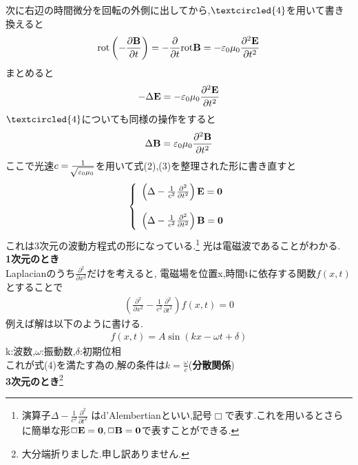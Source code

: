\documentclass{jsarticle}
\begin{document}
次に右辺の時間微分を回転の外側に出してから,$\textcircled{\scriptsize 4}$を用いて書き換えると
\begin{eqnarray*}
{\rm rot} \left( -\frac{\partial {\bf B}}{\partial t} \right) = -\frac{\partial}{\partial t} {\rm rot}{\bf B} = - \varepsilon_0 \mu_0 \frac{\partial^2 {\bf E}}{\partial t^2}
\end{eqnarray*}
まとめると
\begin{eqnarray}
- \Delta {\bf E} = - \varepsilon_0 \mu_0 \frac{\partial^2 {\bf E}}{\partial t^2}
\end{eqnarray}
$\textcircled{\scriptsize 4}$についても同様の操作をすると
\begin{eqnarray}
\Delta {\bf B} = \varepsilon_0 \mu_0 \frac{\partial^2 {\bf B}}{\partial t^2}
\end{eqnarray}
ここで光速$c=\frac{1}{\sqrt[]{\mathstrut \varepsilon_0 \mu_0}}$を用いて式(2),(3)を整理された形に書き直すと
\begin{equation*}
\left \{
\begin{array}{l}
\left( \Delta - \frac{1}{c^2}\frac{\partial^2}{\partial t^2} \right) {\bf E} = {\bf 0} \\
\\
\left( \Delta - \frac{1}{c^2}\frac{\partial^2}{\partial t^2} \right) {\bf B} = {\bf 0}
\end{array}
\right.
\end{equation*}
これは3次元の波動方程式の形になっている.\footnote{演算子$\Delta - \frac{1}{c^2}\frac{\partial^2}{\partial t^2}$ はd'Alembertianといい,記号$\Box$で表す.これを用いるとさらに簡単な形$\Box {\bf E}={\bf 0},\Box {\bf B}={\bf 0}$で表すことができる.}
光は電磁波であることがわかる. \\
{\bf 1次元のとき} \\
Laplacianのうち$\frac{\partial^2}{\partial x^2}$だけを考えると,
電磁場を位置x,時間tに依存する関数$f(x,t)$とすることで
\begin{eqnarray}
\left( \frac{\partial^2}{\partial x^2} - \frac{1}{c^2}\frac{\partial^2}{\partial t^2} \right) f(x,t) =0
\end{eqnarray}
例えば解は以下のように書ける.
\begin{eqnarray*}
f(x,t) = A \sin (kx-\omega t + \delta)
\end{eqnarray*}
k:波数,$\omega$:振動数,$\delta$:初期位相 \\
これが式(4)を満たす為の,解の条件は$k=\frac{\omega}{c}$({\bf 分散関係}) \\
{\bf 3次元のとき}\footnote{大分端折りました.申し訳ありません.} \\
\end{document}
